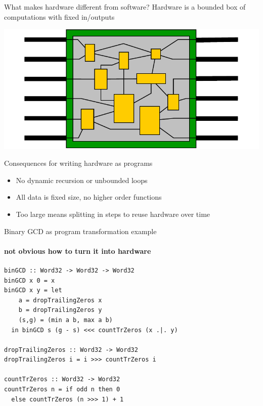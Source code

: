 \documentclass[pdf]{beamer}
\begin{document}
\begin{frame}{What makes hardware different from software?}
Hardware is a bounded box of computations with fixed in/outputs %
\begin{center}
\includegraphics[scale=0.6]{schematic}
\end{center}
\pause
\begin{block}{Consequences for writing hardware as programs}
\begin{itemize}
\item No dynamic recursion or unbounded loops
\item All data is fixed size, no higher order functions
\item \alert{Too large means splitting in steps to reuse hardware over time}
\end{itemize}
\end{block}
\end{frame}


\begin{frame}[fragile]{Binary GCD as program transformation example}
\framesubtitle{not obvious how to turn it into hardware}
\begin{block}{}
\begin{verbatim}
binGCD :: Word32 -> Word32 -> Word32       
binGCD x 0 = x
binGCD x y = let
    a = dropTrailingZeros x
    b = dropTrailingZeros y
    (s,g) = (min a b, max a b)
  in binGCD s (g - s) <<< countTrZeros (x .|. y)

dropTrailingZeros :: Word32 -> Word32
dropTrailingZeros i = i >>> countTrZeros i

countTrZeros :: Word32 -> Word32
countTrZeros n = if odd n then 0 
  else countTrZeros (n >>> 1) + 1
\end{verbatim}
\end{block}

\end{frame}
\end{document}
